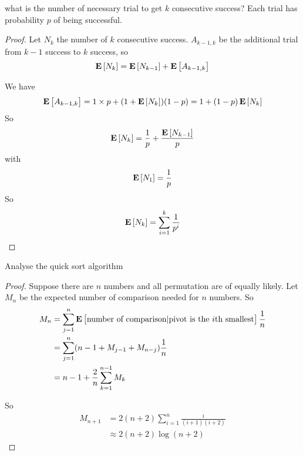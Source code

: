 \begin{example}
what is the number of necessary trial to get $k$ consecutive success? Each trial has probability $p$ of being successful.
\end{example}
\begin{proof}
    Let $N_k$ the number of $k$ consecutive success. $A_{k-1, k}$ be the additional trial from $k-1$ success to $k$ success, so
    \begin{equation*}
        \mathop{\bf E\/}\displaystyle \left[ N_k \right] = \mathop{\bf E\/}\displaystyle \left[ N_{k-1} \right] + \mathop{\bf E\/}\displaystyle \left[ A_{k-1, k} \right]
    \end{equation*}
    
    We have 
    \begin{equation*}
        \mathop{\bf E\/}\displaystyle \left[ A_{k-1,k} \right] = 1 \times p + (1 + \mathop{\bf E\/}\displaystyle \left[ N_k \right]) (1-p) = 1 + (1-p) \mathop{\bf E\/}\displaystyle \left[ N_k \right]
    \end{equation*}
    So
    \begin{equation*}
        \mathop{\bf E\/}\displaystyle \left[ N_k \right] = \frac{1}{p} + \frac{\mathop{\bf E\/}\displaystyle \left[ N_{k-1} \right]}{p}
    \end{equation*}
    with 
    \begin{equation*}
        \mathop{\bf E\/}\displaystyle \left[ N_1 \right] = \frac{1}{p}
    \end{equation*}
    So
    \begin{equation*}
        \mathop{\bf E\/}\displaystyle \left[ N_k \right] = \sum_{i=1}^k \frac{1}{p^i}
    \end{equation*}
\end{proof}


\begin{example}
    Analyse the quick sort algorithm    
\end{example}
\begin{proof}
    Suppose there are $n$ numbers and all permutation are of equally likely. Let $M_n$ be the expected number of comparison needed for $n$ numbers. So
    \begin{equation*}
    \begin{aligned}
        M_n &= \sum_{j=1}^n \mathop{\bf E\/}\displaystyle \left[ \text{number of comparison} | \text{pivot is the } i \text{th smallest} \right] \frac{1}{n} \\
        &= \sum_{j=1}^n (n - 1 + M_{j-1} + M_{n - j}) \frac{1}{n} \\
        &= n - 1 + \frac{2}{n} \sum_{k=1}^{n-1} M_k
    \end{aligned}
    \end{equation*}
    
    So
    \begin{equation*}
        \begin{aligned}
            M_{n+1} &= 2(n+2) \sum_{i=1}^n \frac{i}{(i+1)(i+2)} \\
            &\approx 2(n+2) \log{(n+2)}
        \end{aligned}
    \end{equation*}
\end{proof}


